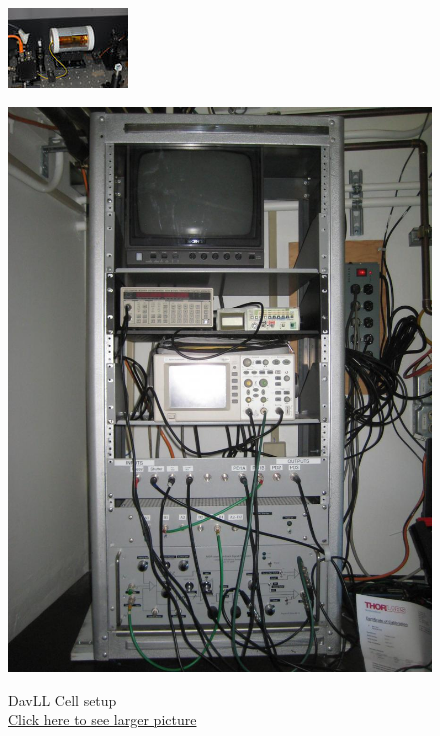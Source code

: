 \documentclass{../lab}
\begin{document}
\begin{figure}[H]
  \label{fig:MOTChamber_284_1.jpg}
\endminipage\hfill
{}
  \href{http://experimentationlab.berkeley.edu/sites/default/files/images/DavLL_289_1.jpg}{\includegraphics[width=\linewidth,keepaspectratio]{images/120px-DavLL_289_t1.jpg}}
  \caption{DavLL Cell setup\\ \href{http://experimentationlab.berkeley.edu/sites/default/files/images/DavLL_289_1.jpg}{Click here to see larger picture}}\label{fig:DavLL_289_1.jpg}
\endminipage\hfill
{}
  \href{http://dev-physicsadv.pantheon.berkeley.edu/sites/default/files/IMG_4086.JPG}{\includegraphics[width=\linewidth,keepaspectratio]{images/IMG_4086.JPG}}

\end{figure}
\end{document}
